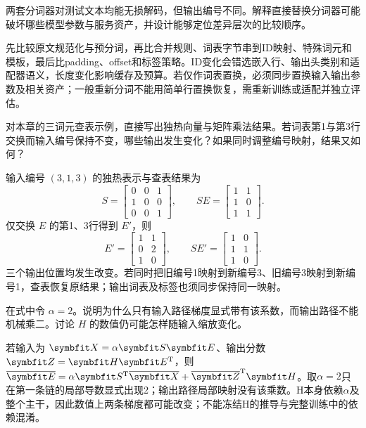 \begin{exercises}
\begin{exercise} 两套分词器对测试文本均能无损解码，但输出编号不同。解释直接替换分词器可能破坏哪些模型参数与服务资产，并设计能够定位差异层次的比较顺序。

\begin{solution}
先比较原文规范化与预分词，再比合并规则、词表字节串到ID映射、特殊词元和模板，最后比padding、offset和标签策略。ID变化会错选嵌入行、输出头类别和适配器语义，长度变化影响缓存及预算。若仅作词表置换，必须同步置换输入输出参数及相关资产；一般重新分词不能用简单行置换恢复，需重新训练或适配并独立评估。
\end{solution}
\end{exercise}

\begin{exercise} 对本章的三词元查表示例，直接写出独热向量与矩阵乘法结果。若词表第1与第3行交换而输入编号保持不变，哪些输出发生变化？如果同时调整编号映射，结果又如何？

\begin{solution}
输入编号 $(3,1,3)$ 的独热表示与查表结果为
\[
S=\begin{bmatrix}0&0&1\\1&0&0\\0&0&1\end{bmatrix},\qquad
SE=\begin{bmatrix}1&1\\1&0\\1&1\end{bmatrix}.
\]
仅交换 $E$ 的第1、3行得到 $E'$，则
\[
E'=\begin{bmatrix}1&1\\0&2\\1&0\end{bmatrix},\qquad
SE'=\begin{bmatrix}1&0\\1&1\\1&0\end{bmatrix}.
\]
三个输出位置均发生改变。若同时把旧编号1映射到新编号3、旧编号3映射到新编号1，查表恢复原结果；输出词表及标签也须同步保持同一映射。
\end{solution}
\end{exercise}

\begin{exercise} 在式中令 $\alpha=2$。说明为什么只有输入路径梯度显式带有该系数，而输出路径不能机械乘二。讨论 $H$ 的数值仍可能怎样随输入缩放变化。

\begin{solution}
若输入为 $\mat{X}=\alpha \mat{S}\mat{E}$、输出分数 $\mat{Z}=\mat{H}\mat{E}^{\mathrm{T}}$，则 $\overline{\mat{E}}=\alpha \mat{S}^{\mathrm{T}}\overline{\mat{X}}+\overline{\mat{Z}}^{\mathrm{T}}\mat{H}$。取$\alpha=2$只在第一条链的局部导数显式出现2；输出路径局部映射没有该乘数。H本身依赖$\alpha$及整个主干，因此数值上两条梯度都可能改变；不能冻结H的推导与完整训练中的依赖混淆。
\end{solution}
\end{exercise}


\end{exercises}
